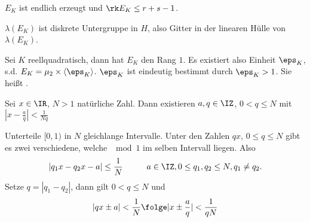 \begin{Folgerung}
 $E_K$ ist endlich erzeugt und $\rk E_K\leq r+s-1$.
\end{Folgerung}

\begin{Beweis}
 $\lambda(E_K)$ ist diskrete Untergruppe in $H$, also Gitter in der linearen Hülle von $\lambda(E_K)$.
\end{Beweis}

\begin{Fakt}
 Sei $K$ reellquadratisch, dann hat $E_K$ den Rang $1$. Es existiert also Einheit $\eps_K$, s.d. $E_K=\mu_2\times \langle \eps_K\rangle$.
 $\eps_K$ ist eindeutig bestimmt durch $\eps_K>1$. Sie heißt .
\end{Fakt}
 
 \begin{Lemma}[DIRICHLET]
  Sei $x\in\IR$, $N>1$ natürliche Zahl. Dann existieren $a,q\in\IZ$, $0<q\leq N$ mit $|x-\frac{a}{q}|<\frac{1}{Nq}$
 \end{Lemma}

 \begin{Beweis}
 Unterteile $[0,1)$ in $N$ gleichlange Intervalle. Unter den Zahlen $qx$, $0\leq q\leq N$ gibt es zwei verschiedene, welche $\mod{1}$ im selben Intervall liegen. 
 Also \[ |q_1x-q_2x-a|\leq \frac{1}{N}\hspace{1cm} a\in\IZ, 0\leq q_1,q_2\leq N, q_1\neq q_2.\]
 Setze $q=|q_1-q_2|$, dann gilt $0<q\leq N$ und
 \[|qx\pm a|<\frac{1}{N}  \folge |x\pm\frac{a}{q}|<\frac{1}{qN}\]
\end{Beweis}


